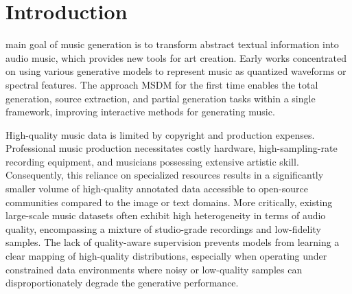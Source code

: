\documentclass[lettersize,journal]{IEEEtran}
\begin{document}

\section{Introduction}
 main goal of music generation is to transform abstract textual information into audio music, which provides new tools for art creation. Early works \cite{Oord_2016,engel2019gansynth} concentrated on using various generative models to represent music as quantized waveforms or spectral features. The approach MSDM\cite{mariani2023multi} for the first time enables the total generation, source extraction, and partial generation tasks within a single framework, improving interactive methods for generating music. 

High-quality music data is limited by copyright and production expenses. Professional music production necessitates costly hardware, high-sampling-rate recording equipment, and musicians possessing extensive artistic skill. Consequently, this reliance on specialized resources results in a significantly smaller volume of high-quality annotated data accessible to open-source communities compared to the image or text domains. More critically, existing large-scale music datasets often exhibit high heterogeneity in terms of audio quality, encompassing a mixture of studio-grade recordings and low-fidelity samples. The lack of quality-aware supervision prevents models from learning a clear mapping of high-quality distributions, especially when operating under constrained data environments where noisy or low-quality samples can disproportionately degrade the generative performance.
\end{document}
